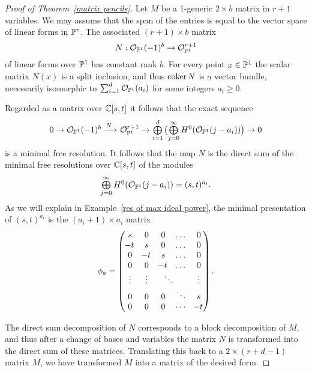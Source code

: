 \begin{proof}[Proof of Theorem~\ref{matrix pencils}]
Let $M$ be a 1-generic $2\times b$ matrix in $r+1$ variables. We may
assume that the span of the entries
is equal to the vector space of linear forms in $\mathbb P^{r}$. The associated
$(r+1)\times b$ matrix
$$
N: {\mathcal O}_{\mathbb P^{1}}(-1)^{b} \to {\mathcal O}_{\mathbb P^{1}}^{r+1}
$$
of linear forms over $\mathbb P^{1}$ has constant rank $b$.
For every point $x\in \mathbb P^{1}$ the scalar matrix $N(x)$ is a split
inclusion, and thus
${\rm{coker}\kern1pt} N$ is a vector bundle, necessarily isomorphic to $\sum_{i
=1}^{d}{\mathcal O}_{\mathbb P^{1}}(a_{i})$ for some
integers $a_{i}\geq 0$.

Regarded as a matrix over ${\mathbb C}[s,t]$ it follows that the exact sequence
$$
\tsty
0\to \sO_{\PP^{1}}(-1)^{b} \ruto {N}
\sO_{\PP^{1}}^{r+1}  \to \bigoplus\limits_{i = 1}^{d}\,\bigl(
\bigoplus\limits_{j=0}^{\infty}H^{0}(\sO_{\PP^{1}}(j-a_{i}))\bigr)\to 0
$$
is a minimal free resolution. It follows that the map $N$ is the direct
sum of the minimal free resolutions over ${\mathbb C}[s,t]$
of the modules
$$
\textstyle
\bigoplus\limits_{j=0}^{\infty}H^{0}({\mathcal O}_{\mathbb P^{1}}(j-a_{i})) = (s,t)^{a_{i}}.
$$
As we will explain in Example~\ref{res of max ideal power}, the minimal
presentation of $(s,t)^{a_{i}}$ is the $(a_{i}+1)\times a_{i}$ matrix
$$
\phi_a=
\left(\,
\begin{matrix}
s&0&0&\dots&0\\
\!-t&s&0&\dots&0\\
0&\!-t&s&\dots&0\\
0&0&\!-t&\dots&0\\
\vdots&\vdots&\rlap{\,$\ddots$}&&\vdots\\
0&0&0&\ddots&s\\
0&0&0&\cdots&\!-t\\
\end{matrix}
\right)
.
\label{phia} %
$$

The direct sum decomposition of $N$ corresponds to a block decomposition
of $M$,
and thus after a change of bases and variables the matrix $N$ is
transformed into the direct sum of these matrices.
Translating this
back to a $2\times (r+d-1)$ matrix $M$, we have
transformed $M$ into a matrix of
the desired form.
\end{proof}

